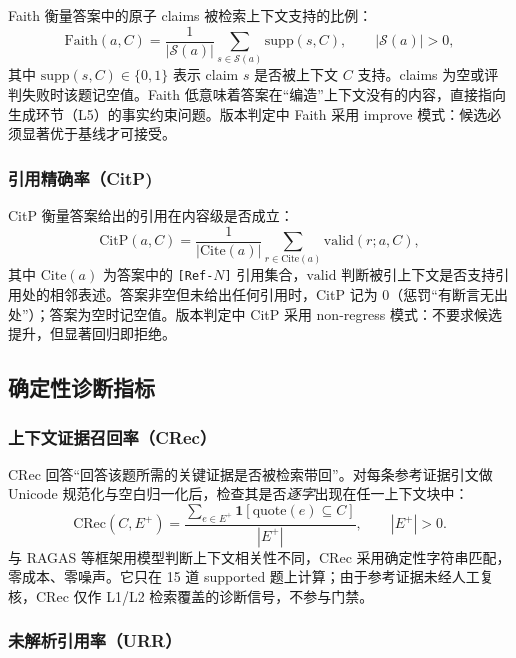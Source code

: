 \documentclass[11pt,a4paper,fontset=fandol]{ctexart}
\begin{document}
Faith 衡量答案中的原子 claims 被检索上下文支持的比例\cite{ragas,trulens}：
\begin{equation}
  \mathrm{Faith}(a,C)=\frac{1}{|\mathcal{S}(a)|}
  \sum_{s\in\mathcal{S}(a)}\mathrm{supp}(s,C),
  \qquad |\mathcal{S}(a)|>0,
  \label{eq:faith}
\end{equation}
其中 $\mathrm{supp}(s,C)\in\{0,1\}$ 表示 claim $s$ 是否被上下文 $C$ 支持。claims 为空或评判失败时该题记空值。Faith 低意味着答案在``编造''上下文没有的内容，直接指向生成环节（L5）的事实约束问题。版本判定中 Faith 采用 improve 模式：候选必须显著优于基线才可接受。

\subsubsection{引用精确率（CitP)}

CitP 衡量答案给出的引用在内容级是否成立\cite{ragchecker}：
\begin{equation}
  \mathrm{CitP}(a,C)=\frac{1}{|\mathrm{Cite}(a)|}
  \sum_{r\in\mathrm{Cite}(a)}\mathrm{valid}(r;a,C),
  \label{eq:citp}
\end{equation}
其中 $\mathrm{Cite}(a)$ 为答案中的 \texttt{[Ref-$N$]} 引用集合，$\mathrm{valid}$ 判断被引上下文是否支持引用处的相邻表述。答案非空但未给出任何引用时，CitP 记为 $0$（惩罚``有断言无出处''）；答案为空时记空值。版本判定中 CitP 采用 non-regress 模式：不要求候选提升，但显著回归即拒绝。

\subsection{确定性诊断指标}

\subsubsection{上下文证据召回率（CRec）}

CRec 回答``回答该题所需的关键证据是否被检索带回''。对每条参考证据引文做 Unicode 规范化与空白归一化后，检查其是否\emph{逐字}出现在任一上下文块中：
\begin{equation}
  \mathrm{CRec}(C,E^+)=\frac{\sum_{e\in E^+}\mathbf{1}\!\left[\mathrm{quote}(e)\subseteq C\right]}{|E^+|},
  \qquad |E^+|>0.
  \label{eq:crec}
\end{equation}
与 RAGAS 等框架用模型判断上下文相关性不同，CRec 采用确定性字符串匹配，零成本、零噪声。它只在 15 道 supported 题上计算；由于参考证据未经人工复核，CRec 仅作 L1/L2 检索覆盖的诊断信号，不参与门禁。

\subsubsection{未解析引用率（URR）}
\end{document}
